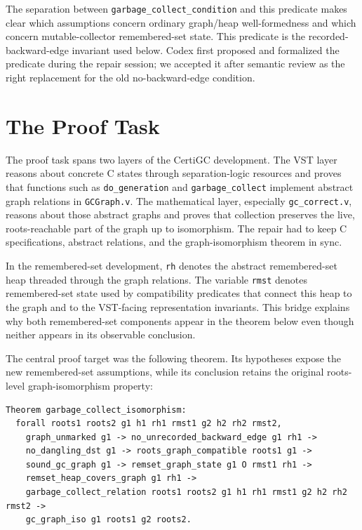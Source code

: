 \documentclass[acmsmall,nonacm]{acmart}
\newcommand{\VST}{VST}
\begin{document}
The separation between \texttt{garbage\_collect\_condition} and this predicate
makes clear which assumptions concern ordinary graph/heap well-formedness and
which concern mutable-collector remembered-set state.  This predicate is the
recorded-backward-edge invariant used below.  Codex first proposed and
formalized the predicate during the repair session; we accepted it
after semantic review as the right replacement for the old no-backward-edge
condition.

\section{The Proof Task}

The proof task spans two layers of the CertiGC development.  The
\VST{} layer reasons about concrete C states through separation-logic
resources and proves that functions such as \texttt{do\_generation} and
\texttt{garbage\_collect} implement abstract graph relations in
\texttt{GCGraph.v}.  The mathematical layer, especially
\texttt{gc\_correct.v}, reasons about those abstract graphs and proves that
collection preserves the live, roots-reachable part of the graph up to
isomorphism.  The repair had to keep C specifications, abstract relations, and
the graph-isomorphism theorem in sync.

In the remembered-set development, \texttt{rh} denotes the abstract
remembered-set heap threaded through the graph relations.  The variable
\texttt{rmst} denotes remembered-set state used by compatibility predicates that
connect this heap to the graph and to the \VST{}-facing representation
invariants.  This bridge explains why both remembered-set components
appear in the theorem below even though neither appears in its observable
conclusion.

The central proof target was the following theorem.  Its hypotheses expose the
new remembered-set assumptions, while its conclusion retains the original
roots-level graph-isomorphism property:

\begin{lstlisting}
Theorem garbage_collect_isomorphism:
  forall roots1 roots2 g1 h1 rh1 rmst1 g2 h2 rh2 rmst2,
    graph_unmarked g1 -> no_unrecorded_backward_edge g1 rh1 ->
    no_dangling_dst g1 -> roots_graph_compatible roots1 g1 ->
    sound_gc_graph g1 -> remset_graph_state g1 O rmst1 rh1 ->
    remset_heap_covers_graph g1 rh1 ->
    garbage_collect_relation roots1 roots2 g1 h1 rh1 rmst1 g2 h2 rh2 rmst2 ->
    gc_graph_iso g1 roots1 g2 roots2.
\end{lstlisting}
\end{document}
